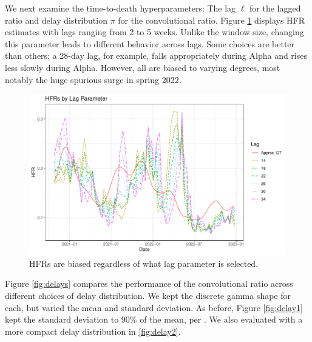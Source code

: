 \documentclass{article}
\begin{document}
We next examine the time-to-death hyperparameters: The lag $\ell$ for the lagged ratio and delay distribution $\pi$ for the convolutional ratio. Figure \ref{fig:lag} displays HFR estimates with lags ranging from 2 to 5 weeks. Unlike the window size, changing this parameter leads to different behavior across lags. Some choices are better than others; a 28-day lag, for example, falls appropriately during Alpha and rises less slowly during Alpha. However, all are biased to varying degrees, most notably the huge spurious surge in spring 2022.

\begin{figure}
    \centering
    \includegraphics[width=0.7\linewidth]{Figs/Real/hfrs_by_lag.pdf}
    \caption{HFRs are biased regardless of what lag parameter is selected.}
    \label{fig:lag}
\end{figure}

Figure \ref{fig:delays} compares the performance of the convolutional ratio across different choices of delay distribution. We kept the discrete gamma shape for each, but varied the mean and standard deviation. As before, Figure \ref{fig:delay1} kept the standard deviation to 90\% of the mean, per \citet{UKdelay}. We also evaluated with a more compact delay distribution in \ref{fig:delay2}. 

\end{document}
